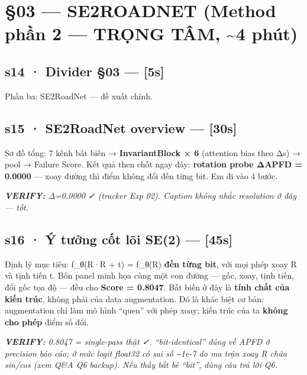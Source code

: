 \documentclass[
  11pt,
]{article}
\renewenvironment{quote}
  {\par\smallskip\noindent
   \def\FrameCommand{{\color{deckorange}\vrule width 2.5pt}\hspace{10pt}}%
   \MakeFramed{\advance\hsize-\width\FrameRestore}%
   \footnotesize\itshape\color{deckslate}}
  {\par\endMakeFramed\smallskip}
\begin{document}
\section{§03 --- SE2ROADNET (Method phần 2 --- TRỌNG TÂM,
\textasciitilde4
phút)}\label{se2roadnet-method-phux1ea7n-2-trux1ecdng-tuxe2m-4-phuxfat}

\subsection{s14 · Divider §03 --- {[}5s{]}}\label{s14-divider-03-5s}

Phần ba: SE2RoadNet --- đề xuất chính.

\subsection{s15 · SE2RoadNet overview ---
{[}30s{]}}\label{s15-se2roadnet-overview-30s}

Sơ đồ tổng: 7 kênh bất biến → \textbf{InvariantBlock × 6} (attention
bias theo Δs) → pool → Failure Score. Kết quả then chốt ngay đây:
\textbf{rotation probe ΔAPFD = 0.0000} --- xoay đường thì điểm không đổi
đến từng bit. Em đi vào 4 bước.

\begin{quote}
\textbf{VERIFY:} Δ=0.0000 ✓ (tracker Exp 02). Caption không nhắc
resolution ở đây --- tốt.
\end{quote}

\subsection{s16 · Ý tưởng cốt lõi SE(2) ---
{[}45s{]}}\label{s16-uxfd-tux1b0ux1edfng-cux1ed1t-luxf5i-se2-45s}

Định lý mục tiêu: f\_θ(R·R + t) = f\_θ(R) \textbf{đến từng bit}, với mọi
phép xoay R và tịnh tiến t. Bốn panel minh họa cùng một con đường ---
gốc, xoay, tịnh tiến, đổi gốc tọa độ --- đều cho \textbf{Score =
0.8047}. Bất biến ở đây là \textbf{tính chất của kiến trúc}, không phải
của data augmentation. Đó là khác biệt cơ bản: augmentation chỉ làm mô
hình ``quen'' với phép xoay; kiến trúc của ta \textbf{không cho phép}
điểm số đổi.

\begin{quote}
\textbf{VERIFY:} 0.8047 = single-pass thật ✓. ``bit-identical'' đúng về
APFD ở precision báo cáo; ở mức logit float32 có sai số
\textasciitilde1e-7 do ma trận xoay R chứa sin/cos (xem Q\&A Q6 backup).
Nếu thầy bắt bẻ ``bit'', dùng câu trả lời Q6.
\end{quote}
\end{document}
